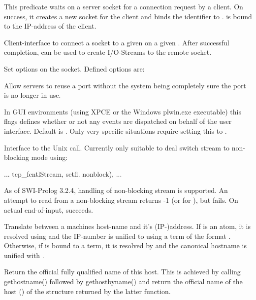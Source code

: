 \documentclass[11pt]{article}
\begin{document}
\begin{description}
This predicate waits on a server socket for a connection request by
a client.  On success, it creates a new socket for the client and
binds the identifier to .    is bound to the
IP-address of the client.

Client-interface to connect a socket to a given  on a given
.  After successful completion,  can be used to
create I/O-Streams to the remote socket.

Set options on the socket.  Defined options are:

\begin{description}
Allow servers to reuse a port without the system being completely sure
the port is no longer in use.

In GUI environments (using XPCE or the Windows plwin.exe executable)
this flags defines whether or not any events are dispatched on behalf of
the user interface. Default is . Only very specific
situations require setting this to .
\end{description}

Interface to the Unix  call.  Currently only suitable
to deal switch stream to non-blocking mode using:

\begin{code}
        ...
        tcp_fcntlStream, setfl. nonblock),
        ...
\end{code}

\noindent
As of SWI-Prolog 3.2.4, handling of non-blocking stream is supported. An
attempt to read from a non-blocking stream returns -1 (or
 for ), but  fails. On actual
end-of-input,  succeeds.

Translate between a machines host-name and it's (IP-)address. If
 is an atom, it is resolved using
 and the IP-number is unified to 
using a term of the format .
Otherwise, if  is bound to a  term, it
is resolved by  and the canonical hostname
is unified with .

Return the official fully qualified name of this host.  This is achieved
by calling gethostname() followed by gethostbyname() and return the 
official name of the host () of the structure returned
by the latter function.
\end{description}
\end{document}
